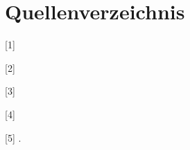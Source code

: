 \chapter{Quellenverzeichnis}

[1] \autocite[Vgl.][]{.06102018}

[2] \autocite[Vgl.][]{.}

[3] \autocite[Vgl.][]{Accso.14102021} 

[4] \autocite[Vgl.][]{Doan.}

[5] \autocite[Vgl.][]{Hartley.05102022}.